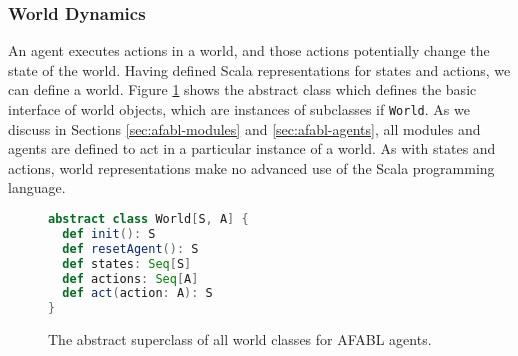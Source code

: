 \subsubsection{World Dynamics}

An agent executes actions in a world, and those actions potentially change the state of the world. Having defined Scala representations for states and actions, we can define a world. Figure \ref{fig:world-code} shows the abstract class which defines the basic interface of world objects, which are instances of subclasses if {\tt World}. As we discuss in Sections \ref{sec:afabl-modules} and \ref{sec:afabl-agents}, all modules and agents are defined to act in a particular instance of a world. As with states and actions, world representations make no advanced use of the Scala programming language.

\begin{figure}[!h]
\begin{center}
\small
\begin{lstlisting}[language=Scala]
abstract class World[S, A] {
  def init(): S
  def resetAgent(): S
  def states: Seq[S]
  def actions: Seq[A]
  def act(action: A): S
}
\end{lstlisting}
\normalsize
\caption{The abstract superclass of all world classes for AFABL agents.}
\end{center}
\label{fig:world-code}
\end{figure}






